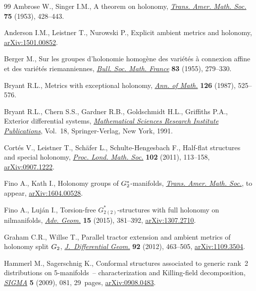 \documentclass[11pt]{article}
\numberwithin{equation}{section}
\begin{document}
\begin{thebibliography}{99}
Ambrose W., Singer I.M., A theorem on holonomy, \href{https://doi.org/10.2307/1990721}{\textit{Trans. Amer. Math.
 Soc.}} \textbf{75} (1953), 428--443.

Anderson I.M., Leistner T., Nurowski P., Explicit ambient metrics and holonomy,
 \href{https://arxiv.org/abs/1501.00852}{arXiv:1501.00852}.

Berger M., Sur les groupes d'holonomie homog\`ene des vari\'et\'es \`a
 connexion affine et des vari\'et\'es rieman\-nien\-nes, \href{https://doi.org/10.24033/bsmf.1464}{\textit{Bull. Soc. Math.
 France}} \textbf{83} (1955), 279--330.

Bryant R.L., Metrics with exceptional holonomy, \href{https://doi.org/10.2307/1971360}{\textit{Ann. of Math.}}
 \textbf{126} (1987), 525--576.

Bryant R.L., Chern S.S., Gardner R.B., Goldschmidt H.L., Griffiths P.A.,
 Exterior differential systems, \href{https://doi.org/10.1007/978-1-4613-9714-4}{\textit{Mathematical Sciences Research
 Institute Publications}}, Vol.~18, Springer-Verlag, New York, 1991.

Cort\'es V., Leistner T., Sch\"afer L., Schulte-Hengesbach F., Half-flat
 structures and special holonomy, \href{https://doi.org/10.1112/plms/pdq012}{\textit{Proc. Lond. Math. Soc.}} \textbf{102}
 (2011), 113--158, \href{https://arxiv.org/abs/0907.1222}{arXiv:0907.1222}.

Fino A., Kath I., Holonomy groups of ${\rm G}_{2}^*$-manifolds, \href{https://doi.org/10.1090/tran/7427}{\textit{Trans.
 Amer. Math. Soc.}}, {t}o appear, \href{https://arxiv.org/abs/1604.00528}{arXiv:1604.00528}.

Fino A., Luj\'an I., Torsion-free {$G^*_{2(2)}$}-structures with full holonomy
 on nilmanifolds, \href{https://doi.org/10.1515/advgeom-2015-0015}{\textit{Adv. Geom.}} \textbf{15} (2015), 381--392,
 \href{https://arxiv.org/abs/1307.2710}{arXiv:1307.2710}.

Graham C.R., Willse T., Parallel tractor extension and ambient metrics of
 holonomy split {${\rm G}_2$}, \href{https://doi.org/10.4310/jdg/1354110197}{\textit{J.~Differential Geom.}} \textbf{92}
 (2012), 463--505, \href{https://arxiv.org/abs/1109.3504}{arXiv:1109.3504}.

Hammerl M., Sagerschnig K., Conformal structures associated to generic rank~2
 distributions on 5-mani\-folds~-- characterization and {K}illing-field
 decomposition, \href{https://doi.org/10.3842/SIGMA.2009.081}{\textit{SIGMA}} \textbf{5} (2009), 081, 29~pages,
 \href{https://arxiv.org/abs/0908.0483}{arXiv:0908.0483}.


\end{thebibliography}
\end{document}
